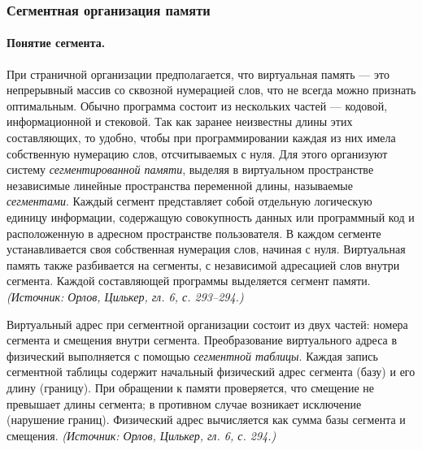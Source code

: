 \documentclass[a4paper,12pt]{article}
\begin{document}
\subsubsection{Сегментная организация памяти}

\paragraph{Понятие сегмента.}
При страничной организации предполагается, что виртуальная память --- это непрерывный массив со сквозной нумерацией слов, что не всегда можно признать оптимальным. Обычно программа состоит из нескольких частей --- кодовой, информационной и стековой. Так как заранее неизвестны длины этих составляющих, то удобно, чтобы при программировании каждая из них имела собственную нумерацию слов, отсчитываемых с нуля. Для этого организуют систему \emph{сегментированной памяти}, выделяя в виртуальном пространстве независимые линейные пространства переменной длины, называемые \emph{сегментами}. Каждый сегмент представляет собой отдельную логическую единицу информации, содержащую совокупность данных или программный код и расположенную в адресном пространстве пользователя. В каждом сегменте устанавливается своя собственная нумерация слов, начиная с нуля. Виртуальная память также разбивается на сегменты, с независимой адресацией слов внутри сегмента. Каждой составляющей программы выделяется сегмент памяти.
\textit{(Источник: Орлов, Цилькер, гл. 6, с. 293--294.)}

Виртуальный адрес при сегментной организации состоит из двух частей: номера сегмента и смещения внутри сегмента. Преобразование виртуального адреса в физический выполняется с помощью \emph{сегментной таблицы}. Каждая запись сегментной таблицы содержит начальный физический адрес сегмента (базу) и его длину (границу). При обращении к памяти проверяется, что смещение не превышает длины сегмента; в противном случае возникает исключение (нарушение границ). Физический адрес вычисляется как сумма базы сегмента и смещения.
\textit{(Источник: Орлов, Цилькер, гл. 6, с. 294.)}
\end{document}
